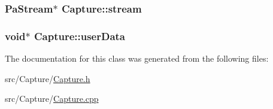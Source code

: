 \hypertarget{class_capture_abc592c61bc547b65c395b8a43c5cf1ad}{
\subsubsection[{stream}]{\setlength{\rightskip}{0pt plus 5cm}Pa\+Stream$\ast$ Capture\+::stream\hspace{0.3cm}{\ttfamily [protected]}}}\label{class_capture_abc592c61bc547b65c395b8a43c5cf1ad}
\hypertarget{class_capture_a0253ca7959f1e3a550502c33612e3c2e}{
\subsubsection[{user\+Data}]{\setlength{\rightskip}{0pt plus 5cm}void$\ast$ Capture\+::user\+Data\hspace{0.3cm}{\ttfamily [protected]}}}\label{class_capture_a0253ca7959f1e3a550502c33612e3c2e}


The documentation for this class was generated from the following files\+:\begin{DoxyCompactItemize}
\item 
src/\+Capture/\hyperlink{_capture_8h}{Capture.\+h}\item 
src/\+Capture/\hyperlink{_capture_8cpp}{Capture.\+cpp}\end{DoxyCompactItemize}
